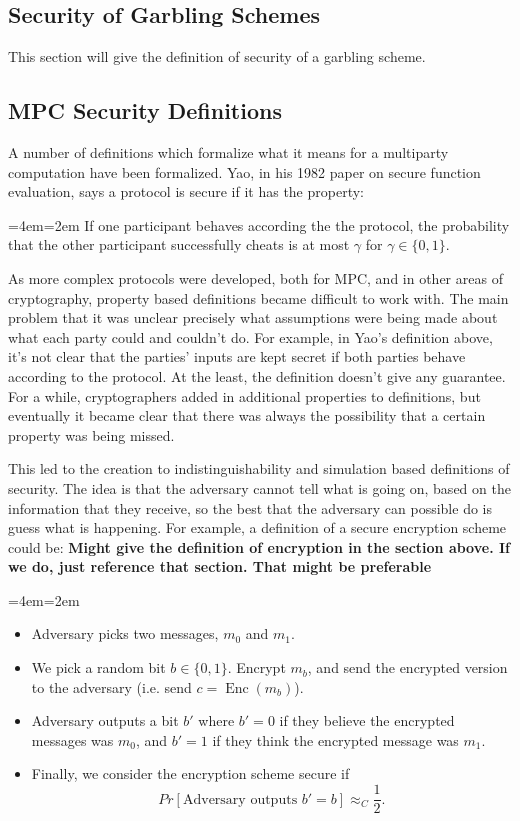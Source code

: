 \documentclass[12pt,twoside]{reedthesis}
\newcommand{\Enc}{\operatorname{Enc}}
\newenvironment{blockquote}{%
  \par%
  \medskip
  \leftskip=4em\rightskip=2em%
  \noindent\ignorespaces}{%
  \par\medskip}
\begin{document}
\subsection{Security of Garbling Schemes}
This section will give the definition of security of a garbling scheme.

\subsection{MPC Security Definitions}
A number of definitions which formalize what it means for a multiparty computation have been formalized. 
Yao, in his 1982 paper on secure function evaluation, says a protocol is secure if it has the property:

\begin{blockquote}
If one participant behaves according the the protocol, the probability that the other participant successfully cheats is at most $\gamma$ for $\gamma \in \{0,1\}$.
\end{blockquote}
As more complex protocols were developed, both for MPC, and in other areas of cryptography, property based definitions became difficult to work with.
The main problem that it was unclear precisely what assumptions were being made about what each party could and couldn't do. 
For example, in Yao's definition above, it's not clear that the parties' inputs are kept secret if both parties behave according to the protocol.
At the least, the definition doesn't give any guarantee.
For a while, cryptographers added in additional properties to definitions, but eventually it became clear that there was always the possibility that a certain property was being missed.

This led to the creation to indistinguishability and simulation based definitions of security.
The idea is that the adversary cannot tell what is going on, based on the information that they receive, so the best that the adversary can possible do is guess what is happening.
For example, a definition of a secure encryption scheme could be:
\textbf{Might give the definition of encryption in the section above. If we do, just reference that section. That might be preferable}
\begin{blockquote}
\begin{itemize}
	\item Adversary picks two messages, $m_0$ and $m_1$. 
	\item We pick a random bit $b \in \{0,1\}$. Encrypt $m_b$, and send the encrypted version to the adversary (i.e. send $c = \Enc(m_b)$).
	\item Adversary outputs a bit $b'$ where $b' = 0$ if they believe the encrypted messages was $m_0$, and $b' = 1$ if they think the encrypted message was $m_1$. 
	\item Finally, we consider the encryption scheme secure if
	$$Pr[\text{Adversary outputs $b' = b$}] \approx_C \frac{1}{2}.$$
\end{itemize}
\end{blockquote}
\end{document}
